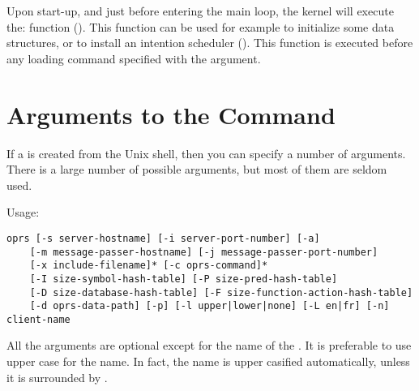 Upon start-up, and just before entering the \CPK{} main loop, the kernel will
execute the:\*
\*
function (). This function can be used for example to
initialize some data structures, or to install an intention scheduler
(). This function is executed before any
loading command specified with the  argument.

\section{Arguments to the \protect{} Command}

If a \CPK{} is created from the Unix shell, then you can specify a number of
arguments. There is a large number of possible arguments, but most of them are
seldom used.

Usage: \begin{verbatim}
oprs [-s server-hostname] [-i server-port-number] [-a]
    [-m message-passer-hostname] [-j message-passer-port-number]
    [-x include-filename]* [-c oprs-command]*
    [-I size-symbol-hash-table] [-P size-pred-hash-table]
    [-D size-database-hash-table] [-F size-function-action-hash-table]
    [-d oprs-data-path] [-p] [-l upper|lower|none] [-L en|fr] [-n] client-name
\end{verbatim}

All the arguments are optional except for the name of the \CPK{}.
It is preferable to use upper case for the name. In fact, the name is upper
casified automatically, unless it is surrounded by \samp{|}.

